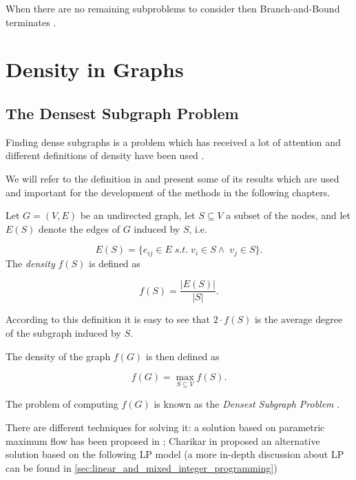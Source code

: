 When there are no remaining subproblems to consider then Branch-and-Bound
terminates \cite{Edgar2001}.

\section{Density in Graphs}%
\label{sec:signed_graphs_and_density}

\subsection{The Densest Subgraph Problem}%
\label{sub:densest_subgraphs}

Finding dense subgraphs is a problem which has received a lot of attention and
different definitions of density have been used
\cite{charikar2000greedy,asahiro1995finding,asahiro2000greedily,feige1997densest}.

We will refer to the definition in \cite{charikar2000greedy} and present some
of its results which are used and important for the development of the methods
in the following chapters.

\medskip

Let $G = (V, E)$ be an undirected graph, let $S \subseteq V$ a subset of the
nodes, and let $E(S)$ denote the edges of $G$ induced by $S$, i.e.

\begin{equation*}
	E(S) = \{e_{ij} \in E \; s.t. \; v_i \in S \land \; v_j \in S\}.
\end{equation*}
The \emph{density} $f(S)$ is defined as

\begin{equation}
	f(S) = \frac{|E(S)|}{|S|}.
\end{equation}

According to this definition it is easy to see that $2 \cdot f(S)$ is the
average degree of the subgraph induced by $S$.

The density of the graph $f(G)$ is then defined as

\begin{equation}
	f(G) = \max_{S \subseteq V} {f(S)}.
\end{equation}

The problem of computing $f(G)$ is known as the \emph{Densest Subgraph Problem}
\cite{charikar2000greedy}.

There are different techniques for solving it: a solution based on parametric
maximum flow has been proposed in \cite{Gallo1989}; Charikar in
\cite{charikar2000greedy} proposed an alternative solution based on the
following \acrlong{LP} model (a more in-depth discussion about \acrshort{LP}
can be found in \autoref{sec:linear_and_mixed_integer_programming})


